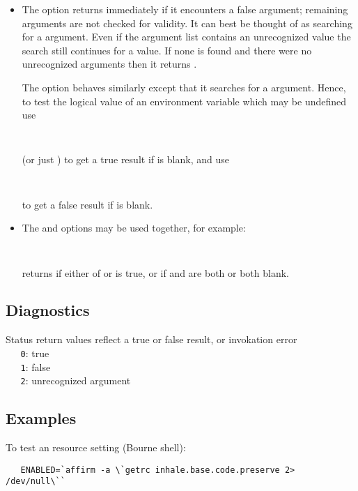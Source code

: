 \begin{itemize}
\item
   The  option returns immediately if it encounters a false argument;
   remaining arguments are not checked for validity.  It can best be thought
   of as searching for a  argument.  Even if the argument list
   contains an unrecognized value the search still continues for a
    value.  If none is found and there were no unrecognized
   arguments then it returns .

   The  option behaves similarly except that it searches for a
    argument.  Hence, to test the logical value of an environment
   variable which may be undefined use

   \verb+   +

   \noindent
   (or just ) to get a true result if  is blank,
   and use

   \verb+   +

   \noindent
   to get a false result if  is blank.

\item
   The  and  options may be used together, for example:

   \verb+   +

   \noindent
   returns  if either of  or  is true, or if
    and  are both  or both blank.
\end{itemize}

\subsection*{Diagnostics}

Status return values reflect a true or false result, or invokation error
\\ \verb+   0+: true
\\ \verb+   1+: false
\\ \verb+   2+: unrecognized argument

\subsection*{Examples}

To test an  resource setting (Bourne shell):

\begin{verbatim}
   ENABLED=`affirm -a \`getrc inhale.base.code.preserve 2> /dev/null\``
\end{verbatim}


